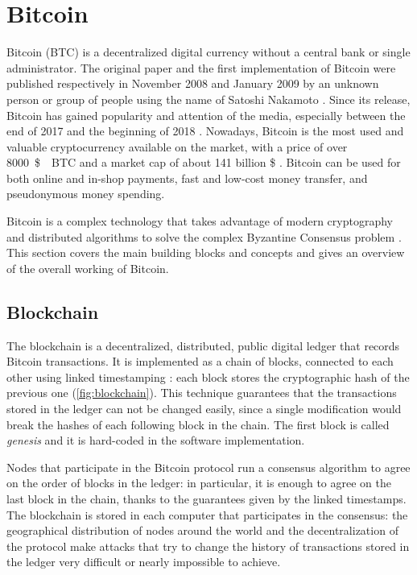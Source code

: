 \chapter{Bitcoin}
\label{chapter:bitcoin}
Bitcoin (BTC) is a decentralized digital currency without a central bank or single administrator.
The original paper \cite{bitcoin_2009} and the first implementation of Bitcoin were published respectively in November \num{2008} and January \num{2009} by an unknown person or group of people using the name of Satoshi Nakamoto \cite{bitcoin_website}.
Since its release, Bitcoin has gained popularity and attention of the media, especially between the end of \num{2017} and the beginning of \num{2018} \cite{bbc_2018, telegraph_2018, ilsole24ore_2018}.
Nowadays, Bitcoin is the most used and valuable cryptocurrency available on the market, with a price of over \SI{8000}{\$ \per BTC} and a market cap of about \num{141} billion \$ \cite{bitcoin_usage_study_2017, stats_coinmarketcap, stats_coinranking, stats_cryptocompare, stats_coincheckup, stats_moonstats}.
Bitcoin can be used for both online and in-shop payments, fast and low-cost money transfer, and pseudonymous money spending.

\medskip
Bitcoin is a complex technology that takes advantage of modern cryptography and distributed algorithms to solve the complex Byzantine Consensus problem \cite{byzantin_generals_1982}.
This section covers the main building blocks and concepts and gives an overview of the overall working of Bitcoin.

\section{Blockchain}
The blockchain is a decentralized, distributed, public digital ledger that records Bitcoin transactions.
It is implemented as a chain of blocks, connected to each other using linked timestamping \cite{bitcoin_book_narayanan_2016, hash_function_wikipedia}:
each block stores the cryptographic hash of the previous one (\cref{fig:blockchain}).
This technique guarantees that the transactions stored in the ledger can not be changed easily, since a single modification would break the hashes of each following block in the chain.
The first block is called \textit{genesis} and it is hard-coded in the software implementation.

Nodes that participate in the Bitcoin protocol run a consensus algorithm to agree on the order of blocks in the ledger:
in particular, it is enough to agree on the last block in the chain, thanks to the guarantees given by the linked timestamps.
The blockchain is stored in each computer that participates in the consensus:
the geographical distribution of nodes around the world and the decentralization of the protocol make attacks that try to change the history of transactions stored in the ledger very difficult or nearly impossible to achieve.

